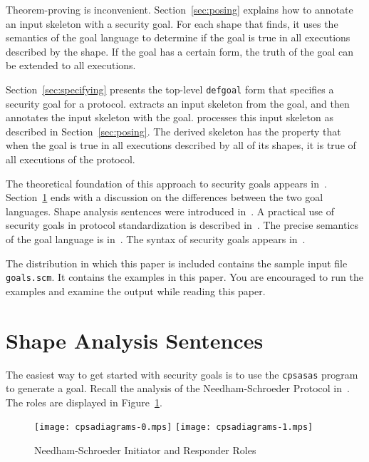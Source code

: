 \documentclass[12pt]{article}
\begin{document}
Theorem-proving is inconvenient.  Section~\ref{sec:posing} explains
how to annotate an input skeleton with a security goal.  For each
shape that {\cpsa} finds, it uses the semantics of the goal language
to determine if the goal is true in all executions described by the
shape.  If the goal has a certain form, the truth of the goal can be
extended to all executions.

Section~\ref{sec:specifying} presents the top-level \texttt{defgoal}
form that specifies a security goal for a protocol.  {\cpsa} extracts
an input skeleton from the goal, and then annotates the input skeleton
with the goal.  {\cpsa} processes this input skeleton as described in
Section~\ref{sec:posing}.  The derived skeleton has the property that
when the goal is true in all executions described by all of its shapes,
it is true of all executions of the protocol.

The theoretical foundation of this approach to security goals appears
in~\cite{Guttman14}.  Section~\ref{sec:sas} ends with a discussion on
the differences between the two goal languages.  Shape analysis
sentences were introduced in~\cite{Ramsdell12}.  A practical use of
security goals in protocol standardization is described
in~\cite{GuttmanLiskovRowe14}.  The precise semantics of the goal
language is in~\cite{cpsaspec09}.  The syntax of security goals
appears in~\cite[Table~2]{cpsaprimer09}.

The distribution in which this paper is included contains the sample
input {\cpsa} file \texttt{goals.scm}.  It contains the examples in
this paper.  You are encouraged to run the examples and examine the
output while reading this paper.

\section{Shape Analysis Sentences}\label{sec:sas}

The easiest way to get started with security goals is to use the
\texttt{cpsasas} program to generate a goal.  Recall the analysis of
the Needham-Schroeder Protocol in~\cite[Section~10]{cpsaprimer09}.
The roles are displayed in Figure~\ref{fig:ns roles}.

\begin{figure}
\begin{center}
\texttt{[image: cpsadiagrams-0.mps]}\hfil
\texttt{[image: cpsadiagrams-1.mps]}
\caption{Needham-Schroeder Initiator and Responder Roles}
\label{fig:ns roles}
\end{center}
\end{figure}
\end{document}
